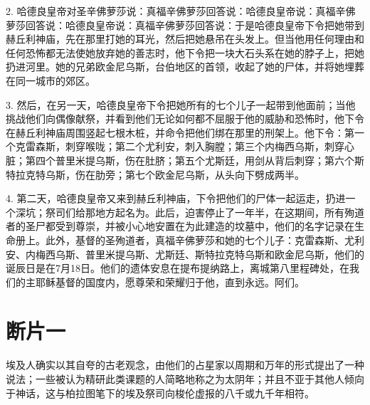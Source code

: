 2. 哈德良皇帝对圣辛佛萝莎说：真福辛佛萝莎回答说：哈德良皇帝说：真福辛佛萝莎回答说：哈德良皇帝说：真福辛佛萝莎回答说：于是哈德良皇帝下令把她带到赫丘利神庙，先在那里打她的耳光，然后把她悬吊在头发上。但当他用任何理由和任何恐怖都无法使她放弃她的善志时，他下令把一块大石头系在她的脖子上，把她扔进河里。她的兄弟欧金尼乌斯，台伯地区的首领，收起了她的尸体，并将她埋葬在同一城市的郊区。\par

3. 然后，在另一天，哈德良皇帝下令把她所有的七个儿子一起带到他面前；当他挑战他们向偶像献祭，并看到他们无论如何都不屈服于他的威胁和恐怖时，他下令在赫丘利神庙周围竖起七根木桩，并命令把他们绑在那里的刑架上。他下令：第一个克雷森斯，刺穿喉咙；第二个尤利安，刺入胸膛；第三个内梅西乌斯，刺穿心脏；第四个普里米提乌斯，伤在肚脐；第五个尤斯廷，用剑从背后刺穿；第六个斯特拉克特乌斯，伤在肋旁；第七个欧金尼乌斯，从头向下劈成两半。\par

4. 第二天，哈德良皇帝又来到赫丘利神庙，下令把他们的尸体一起运走，扔进一个深坑；祭司们给那地方起名为。此后，迫害停止了一年半，在这期间，所有殉道者的圣尸都受到尊崇，并被小心地安置在为此建造的坟墓中，他们的名字记录在生命册上。此外，基督的圣殉道者，真福辛佛萝莎和她的七个儿子：克雷森斯、尤利安、内梅西乌斯、普里米提乌斯、尤斯廷、斯特拉克特乌斯和欧金尼乌斯，他们的诞辰日是在7月18日。他们的遗体安息在提布提纳路上，离城第八里程碑处，在我们的主耶稣基督的国度内，愿尊荣和荣耀归于他，直到永远。阿们。\par


\section{断片一}

\par

埃及人确实以其自夸的古老观念，由他们的占星家以周期和万年的形式提出了一种说法；一些被认为精研此类课题的人简略地称之为太阴年；并且不亚于其他人倾向于神话，这与柏拉图笔下的埃及祭司向梭伦虚报的八千或九千年相符。\par

